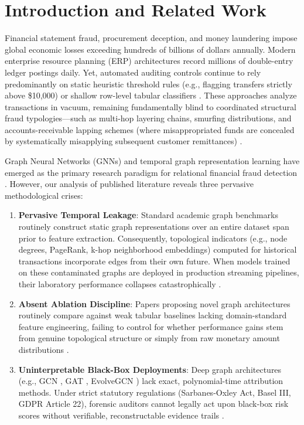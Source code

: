\section{Introduction and Related Work}\label{sec:intro}

Financial statement fraud, procurement deception, and money laundering impose global economic losses exceeding hundreds of billions of dollars annually. Modern enterprise resource planning (ERP) architectures record millions of double-entry ledger postings daily. Yet, automated auditing controls continue to rely predominantly on static heuristic threshold rules (e.g., flagging transfers strictly above \$10,000) or shallow row-level tabular classifiers \cite{salih2021survey}. These approaches analyze transactions in vacuum, remaining fundamentally blind to coordinated structural fraud typologies---such as multi-hop layering chains, smurfing distributions, and accounts-receivable lapping schemes (where misappropriated funds are concealed by systematically misapplying subsequent customer remittances) \cite{motie2024gnn,salih2021survey}.

Graph Neural Networks (GNNs) and temporal graph representation learning have emerged as the primary research paradigm for relational financial fraud detection \cite{yuan2025survey,rossi2020temporal}. However, our analysis of published literature reveals three pervasive methodological crises:
\begin{enumerate}
    \item \textbf{Pervasive Temporal Leakage}: Standard academic graph benchmarks routinely construct static graph representations over an entire dataset span prior to feature extraction. Consequently, topological indicators (e.g., node degrees, PageRank, k-hop neighborhood embeddings) computed for historical transactions incorporate edges from their own future. When models trained on these contaminated graphs are deployed in production streaming pipelines, their laboratory performance collapses catastrophically \cite{jesus2022turning}.
    \item \textbf{Absent Ablation Discipline}: Papers proposing novel graph architectures routinely compare against weak tabular baselines lacking domain-standard feature engineering, failing to control for whether performance gains stem from genuine topological structure or simply from raw monetary amount distributions \cite{chen2016xgboost,lin2017focal}.
    \item \textbf{Uninterpretable Black-Box Deployments}: Deep graph architectures (e.g., GCN \cite{kipf2017gcn}, GAT \cite{velickovic2018gat}, EvolveGCN \cite{pareja2020evolvegcn}) lack exact, polynomial-time attribution methods. Under strict statutory regulations (Sarbanes-Oxley Act, Basel III, GDPR Article 22), forensic auditors cannot legally act upon black-box risk scores without verifiable, reconstructable evidence trails \cite{faccia2026xaiauditing,uddin2026shapley,lundberg2020treeshap}.
\end{enumerate}

